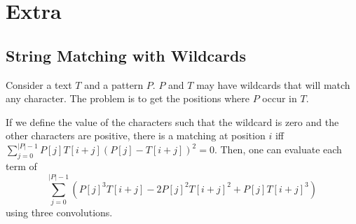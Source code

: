 \section{Extra}

\subsection{String Matching with Wildcards}


Consider a text $T$ and a pattern $P$. $P$ and $T$ may have wildcards that will match any character. The problem is to get the positions where $P$ occur in $T$.

If we define the value of the characters such that the wildcard is zero and the other characters are positive, there is a matching at position $i$ iff $\sum_{j=0}^{|P|-1}P[j]T[i+j](P[j] - T[i + j])^2 = 0$. Then, one can evaluate each term of 
$$ \sum_{j=0}^{|P|-1}(P[j]^3T[i+j] - 2P[j]^2T[i+j]^2 + P[j]T[i + j]^3) $$ 
using three convolutions.
